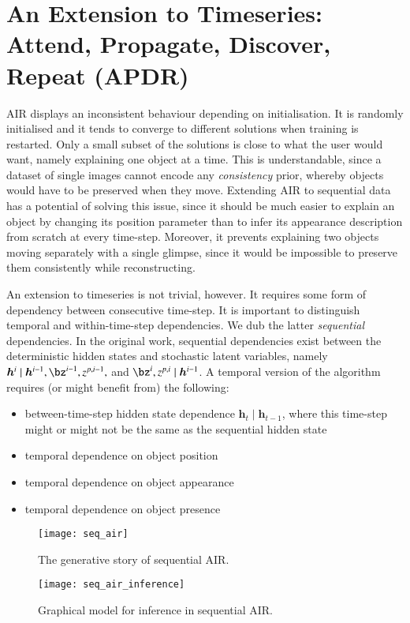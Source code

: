 \section{An Extension to Timeseries: Attend, Propagate, Discover, Repeat (APDR)}
AIR displays an inconsistent behaviour depending on initialisation. It is randomly initialised and it tends to converge to different solutions when training is restarted. Only a small subset of the solutions is close to what the user would want, namely explaining one object at a time. This is understandable, since a dataset of single images cannot encode any \emph{consistency} prior, whereby objects would have to be preserved when they move. Extending AIR to sequential data has a potential of solving this issue, since it should be much easier to explain an object by changing its position parameter than to infer its appearance description from scratch at every time-step. Moreover, it prevents explaining two objects moving separately with a single glimpse, since it would be impossible to preserve them consistently while reconstructing.

An extension to timeseries is not trivial, however. It requires some form of dependency between consecutive time-step. It is important to distinguish temporal and within-time-step dependencies. We dub the latter \emph{sequential} dependencies. In the original work, sequential dependencies exist between the deterministic hidden states and stochastic latent variables, namely $\bm{h}^i \mid \bm{h}^{i-1}, \bz^{i-1}, z^{p, i-1},$ and $\bz^i, z^{p, i} \mid \bm{h}^{i-1}$. A temporal version of the algorithm requires (or might benefit from) the following:
\begin{itemize}
    \item between-time-step hidden state dependence \eg $\bm{h}_t \mid \bm{h}_{t-1}$, where this time-step might or might not be the same as the sequential hidden state
    \item temporal dependence on object position
    \item temporal dependence on object appearance
    \item temporal dependence on object presence
\end{itemize}

\begin{figure}
    \texttt{[image: seq\_air]}
    \caption{The generative story of sequential AIR.}
    \label{fig:seq_air}
\end{figure}

\begin{figure}
    \texttt{[image: seq\_air\_inference]}
    \caption{Graphical model for inference in sequential AIR.}
    \label{fig:seq_air_inf}
\end{figure}

